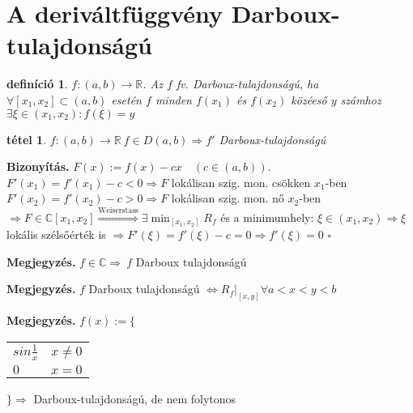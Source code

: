 \documentclass{article}
\newcommand{\ob}{\hfill$\square$}
\newcommand{\fab}{f\colon (a,b)\rightarrow\mathbb{R}}
\newcommand{\fdab}{f\in D(a,b)}
\newcommand{\ek}{\Longleftrightarrow}
\newcommand{\C}{\mathbb{C}}
\newcommand{\nn}{\Rightarrow}
\newcommand{\di}{\displaystyle}
\theoremstyle{magyar}
\newtheorem{de}{definíció}[section]
\newtheorem{te}{tétel}[section]
\newenvironment{biz}{\begin{trivlist}\item\relax\mbox{\textbf{Bizonyítás.\enskip}}\ignorespaces}{\ob\end{trivlist}}
\newenvironment{megj}{\begin{trivlist}\item\relax\mbox{\textbf{Megjegyzés.\enskip}}\ignorespaces}{\end{trivlist}}
\begin{document}
  \newpage
  \section{A deriváltfüggvény Darboux-tulajdonságú}
  \begin{de}
    $\fab$. Az $f$ fv. Darboux-tulajdonságú, ha 
    $\forall [x_1,x_2]\subset(a,b)$ esetén $f$ minden $f(x_1)$ és $f(x_2)$ közéeső $y$ számhoz
    $\exists\xi\in(x_1,x_2): f(\xi)=y$
  \end{de}
  \begin{te}
    $\fab\ \fdab\nn f'$ Darboux-tulajdonságú
  \end{te}
  \begin{biz}
    $F(x) :=  f(x) -cx\quad(c\in(a,b))$.\\
    $F'(x_1) = f'(x_1) -c < 0\nn F$ lokálisan szig. mon. csökken $x_1$-ben\\
    $F'(x_2) = f'(x_2) -c > 0\nn F$ lokálisan szig. mon. nő $x_2$-ben\\
    $\nn F\in\C[x_1,x_2]\overset{\mathrm{Weiserstass}}{\nn} \exists
    \di\min_{[x_1,x_2]} R_f$ és a  minimumhely: $\xi\in(x_1,x_2)\nn\xi$
    lokális szélsőérték is $\nn F'(\xi) = f'(\xi) -c =0 \nn f'(\xi)=0$
  \end{biz}
  \begin{megj}
    $f\in \C\nn\ f$ Darboux tulajdonságú
  \end{megj}
  \begin{megj}
    $f$ Darboux tulajdonságú $\ek R_f|_{[x,y]} \forall a<x<y<b$
  \end{megj}
  \begin{megj}
    $f(x):=\Bigg\{$ \begin{tabular}{ll}
      $sin\frac1{x}$ & $x\not=0$\\
  $0$ & $x=0$
    \end{tabular}$\Bigg\}\nn$ Darboux-tulajdonságú, de nem folytonos
  \end{megj}

  \newpage
\end{document}
